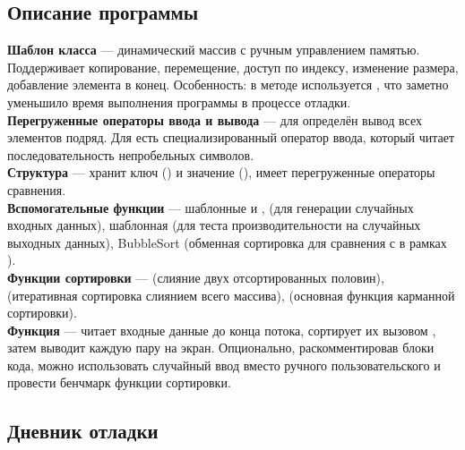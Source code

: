 \documentclass[12pt]{article}
\begin{document}
\subsection*{Описание программы}
\hspace{2ex}
\textbf{Шаблон класса } — динамический массив с ручным управлением памятью. Поддерживает копирование, перемещение, доступ по индексу, изменение размера, добавление элемента в конец. Особенность: в методе  используется , что заметно уменьшило время выполнения программы в процессе отладки. \\

\textbf{Перегруженные операторы ввода и вывода} — для  определён вывод всех элементов подряд. Для  есть специализированный оператор ввода, который читает последовательность непробельных символов. \\

\textbf{Структура } — хранит ключ () и значение (), имеет перегруженные операторы сравнения. \\

\textbf{Вспомогательные функции} — шаблонные  и ,  (для генерации случайных входных данных), шаблонная  (для теста производительности на случайных выходных данных), BubbleSort (обменная сортировка для сравнения с  в рамках ). \\

\textbf{Функции сортировки} —  (слияние двух отсортированных половин),  (итеративная сортировка слиянием всего массива),  (основная функция карманной сортировки). \\

\textbf{Функция } — читает входные данные до конца потока, сортирует их вызовом , затем выводит каждую пару на экран. Опционально, раскомментировав блоки кода, можно использовать случайный ввод вместо ручного пользовательского и провести бенчмарк функции сортировки. \\

\subsection*{Дневник отладки}
\end{document}
